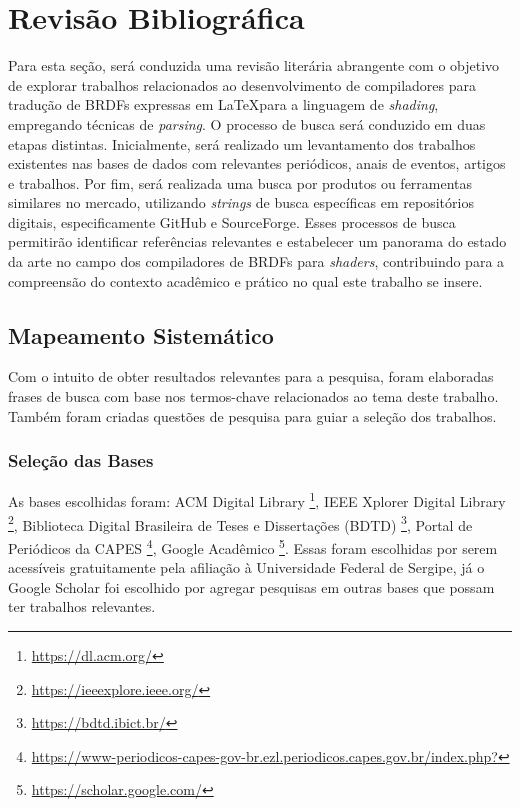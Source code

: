 \documentclass[english, 
               brazil, 
               bsc] %
               {dcomp-abntex2}
\begin{document}
\chapter{Revisão Bibliográfica} \label{revisao}


Para esta seção, será conduzida uma revisão literária abrangente com o objetivo de explorar trabalhos relacionados ao desenvolvimento de compiladores para tradução de BRDFs expressas em \LaTeX  para a linguagem de \textit{shading}, empregando técnicas de \textit{parsing}. O processo de busca será conduzido em duas etapas distintas. Inicialmente, será realizado um levantamento dos trabalhos existentes nas bases de dados  com relevantes periódicos, anais de eventos, artigos e trabalhos. Por fim, será realizada uma busca por produtos ou ferramentas similares no mercado, utilizando \textit{strings} de busca específicas em repositórios digitais, especificamente GitHub e SourceForge. Esses processos de busca permitirão identificar referências relevantes e estabelecer um panorama do estado da arte no campo dos compiladores de BRDFs  para \textit{shaders}, contribuindo para a compreensão do contexto acadêmico e prático no qual este trabalho se insere.


\section{Mapeamento Sistemático}


Com o intuito de obter resultados relevantes para a pesquisa, foram elaboradas frases de busca com base nos termos-chave relacionados ao tema deste trabalho. Também foram criadas questões de pesquisa para guiar a seleção dos trabalhos.


\subsection{Seleção das Bases}
As bases escolhidas foram: ACM Digital Library \footnote{\url{https://dl.acm.org/}},  IEEE Xplorer Digital Library \footnote{\url{https://ieeexplore.ieee.org/}},  Biblioteca Digital Brasileira de Teses e Dissertações (BDTD) \footnote{\url{https://bdtd.ibict.br/}}, Portal de Periódicos da CAPES \footnote{\url{https://www-periodicos-capes-gov-br.ezl.periodicos.capes.gov.br/index.php?}},  Google Acadêmico \footnote{\url{https://scholar.google.com/}}. Essas foram escolhidas por serem acessíveis gratuitamente pela afiliação à Universidade Federal de Sergipe, já o Google Scholar foi escolhido por agregar pesquisas em outras bases que possam ter trabalhos relevantes.
\end{document}

